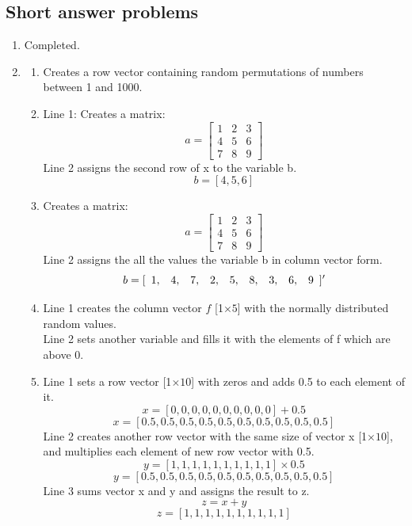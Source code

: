 \documentclass[man]{apa6}
\begin{document}
\subsection{Short answer problems}
	\begin{enumerate}
		\item Completed.
		
		\item 
			\begin{enumerate}
				\item Creates a row vector containing random permutations of numbers between 1 and 1000.
				
				\item Line 1: Creates a matrix: \\
					\[ a= \left[ \begin{array}{ccc}
					1 & 2 & 3 \\
					4 & 5 & 6 \\
					7 & 8 & 9 \end{array} \right]\] 
					Line 2 assigns the second row of x to the variable b.
					$$b = [4,5,6]$$

				\item Creates a matrix: \\
					\[ a= \left[ \begin{array}{ccc}
					1 & 2 & 3 \\
					4 & 5 & 6 \\
					7 & 8 & 9 \end{array} \right]\] 
					Line 2 assigns the all the values the variable b in column vector form.
					$$b= [\begin{array}{c c c c c c c c c}1, & 4, & 7, & 2, & 5, & 8, & 3, & 6, & 9 \end{array}] '$$

				\item Line 1 creates the column vector $f$ [1$\times5$] with the normally distributed random values. \\
					Line 2 sets another variable and fills it with the elements of f which are above 0.

				\item Line 1 sets a row vector  [1$\times10$] with zeros and adds 0.5 to each element of it.
					$$x = [0, 0, 0, 0, 0 ,0 , 0, 0, 0, 0] + 0.5$$
					$$x= [0.5, 0.5, 0.5, 0.5, 0.5, 0.5, 0.5, 0.5, 0.5, 0.5]$$
					Line 2 creates another row vector with the same size of vector x [1$\times10$], and multiplies each element of new row vector with 0.5. \\
					$$y = [1, 1, 1, 1, 1 , 1, 1, 1, 1, 1] \times 0.5$$
					$$y= [0.5, 0.5, 0.5, 0.5, 0.5, 0.5, 0.5, 0.5, 0.5, 0.5]$$
					Line 3 sums vector x and y and assigns the result to z.
					$$z = x + y$$
					$$z= [1, 1, 1, 1, 1, 1, 1, 1, 1, 1]$$
					

\end{enumerate}
\end{enumerate}
\end{document}
